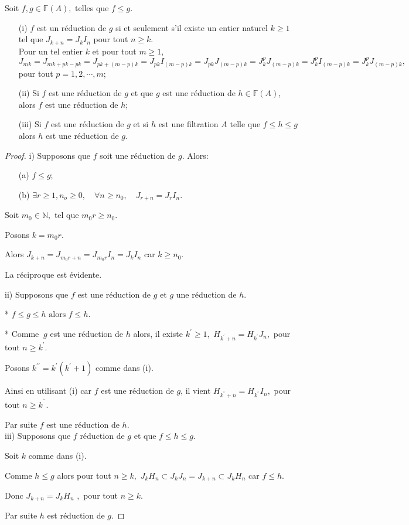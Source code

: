 \begin{maproposition}
	Soit $f,g \in \mathbb{F}(A),$ telles que $f \leqslant g$.
	\begin{enumerate}
		\label{maprop4}
		\item[(i)] $f$ est un réduction de $g$ si et seulement s'il existe un entier naturel $k \geqslant 1$ tel que $J_{k+n}  = J_{k}I_n$ pour tout $n \geqslant k$.\\ Pour un tel entier $k$ et pour tout $m \geqslant 1$, $J_{mk}=J_{mk+pk-pk}=J_{pk+(m-p)k}=J_{pk}I_{(m-p)k}=J_{pk}J_{(m-p)k}=J_{k}^{p}J_{(m-p)k}=J_{k}^{p}I_{(m-p)k}=J_{k}^{p}J_{(m-p)k},$\\ pour tout $p=1,2,\cdots,m$;
		\item[(ii)] Si $f$ est une réduction de $g$ et que $g$ est une réduction de $h \in \mathbb{F}(A)$, alors $f$ est une réduction de $h$;
		\item[(iii)] Si $f$ est une réduction de $g$ et si $h$ est une filtration $A$ telle que $f \leqslant h \leqslant g$ alors $h$ est une réduction de $g$.
	\end{enumerate}
\end{maproposition}
\begin{proof}
	i) Supposons que $f$ soit une réduction de $g$. Alors:
	\begin{enumerate}
		\item[(a)] $f \leqslant g$;
		\item[(b)] $\exists r \geqslant 1,n_o \geqslant 0 ,\quad \forall n \geqslant n_0,\quad J_{r+n}= J_r I_n $.
	\end{enumerate}
	Soit $m_{0}\in \mathbb{N},$ tel que $m_{0}r\geq n_{0}$.
	
	Posons $k=m_{0}r$.
	
	Alors $J_{k+n}=J_{m_{0}r+n}=J_{m_{0}r}I_{n}=J_{k}I_{n}$ car $k\geq n_{0}.$
	
	La réciproque est évidente.
	
	ii) Supposons que $f$ est une réduction de $g$ et $g$ une réduction
	de $h.$
	
	* $f\leq g\leq h\text{ alors } f\leq h$.
	
	* Comme $\ g$ est une réduction de $h$ alors, il existe $k^{\prime }\geq
	1,$ $H_{k^{\prime }+n}=H_{k^{\prime }}J_{n},$ pour tout $n\geq k^{\prime }.$
	
	Posons $k^{\prime \prime }=k^{\prime }(k^{\prime }+1)$ comme dans (i).
	
	Ainsi en utilisant (i) car $f$ est une réduction de $g$, il vient  $H_{k^{^{\prime \prime }}+n}=H_{k^{^{\prime \prime }}}I_{n},$ pour tout $n\geq k^{^{\prime \prime }}.$
	
	Par suite $f$ est une réduction de $h$. \\
	
	iii) Supposons que $f$ réduction de $g$ et que $f\leq h\leq g.$
	
	Soit $k$ comme dans (i).
	
	Comme $h\leq g$ alors pour tout $n\geq k,$ $J_{k}H_{n}\subset
	J_{k}J_{n}=J_{k+n}\subset J_{k}H_{n}$ car $f\leq h.$
	
	Donc $J_{k+n}=J_{k}H_{n}$ $,$ pour tout $n\geq k.$
	
	Par suite $h$ est réduction de $g.$
\end{proof}

